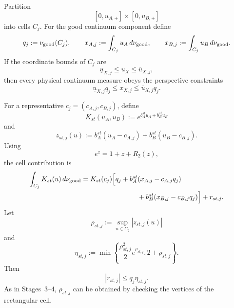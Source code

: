 \documentclass[11pt]{article}
\theoremstyle{remark}
\begin{document}
Partition
\[
    [0,u_{A,+}]
    \times
    [0,u_{B,+}]
\]
into cells \(C_j\).  For the good continuum component define
\begin{equation}
    q_j
    :=
    \nu_{\rm good}(C_j),
    \qquad
    x_{A,j}
    :=
    \int_{C_j}u_A\,d\nu_{\rm good},
    \qquad
    x_{B,j}
    :=
    \int_{C_j}u_B\,d\nu_{\rm good}.
    \label{eq:stage5b-cell-vars}
\end{equation}
If the coordinate bounds of \(C_j\) are
\[
    \underline u_{X,j}
    \le
    u_X
    \le
    \overline u_{X,j},
\]
then every physical continuum measure obeys the perspective constraints
\begin{equation}
    \underline u_{X,j}q_j
    \le
    x_{X,j}
    \le
    \overline u_{X,j}q_j.
    \label{eq:stage5b-perspective}
\end{equation}

For a representative \(c_j=(c_{A,j},c_{B,j})\), define
\[
    K_{st}(u_A,u_B)
    :=
    e^{b_A^{st}u_A+b_B^{st}u_B}
\]
and
\[
    z_{st,j}(u)
    :=
    b_A^{st}(u_A-c_{A,j})
    +
    b_B^{st}(u_B-c_{B,j}).
\]
Using
\[
    e^z=1+z+R_2(z),
\]
the cell contribution is
\begin{align}
    \int_{C_j}K_{st}(u)\,d\nu_{\rm good}
    &=
    K_{st}(c_j)
    \Big[
      q_j
      +
      b_A^{st}
      (x_{A,j}-c_{A,j}q_j)
      \nonumber\\
    &\hspace{29mm}
      +
      b_B^{st}
      (x_{B,j}-c_{B,j}q_j)
    \Big]
    +
    r_{st,j}.
    \label{eq:stage5b-cell-linearization}
\end{align}
Let
\begin{equation}
    \rho_{st,j}
    :=
    \sup_{u\in C_j}
    |z_{st,j}(u)|
\end{equation}
and
\begin{equation}
    \eta_{st,j}
    :=
    \min\!\left\{
      \frac{\rho_{st,j}^2}{2}e^{\rho_{st,j}},
      2+\rho_{st,j}
    \right\}.
    \label{eq:stage5b-eta}
\end{equation}
Then
\begin{equation}
    |r_{st,j}|
    \le
    q_j\eta_{st,j}.
    \label{eq:stage5b-cell-remainder}
\end{equation}
As in Stages~3--4, \(\rho_{st,j}\) can be obtained by checking the vertices
of the rectangular cell.
\end{document}
